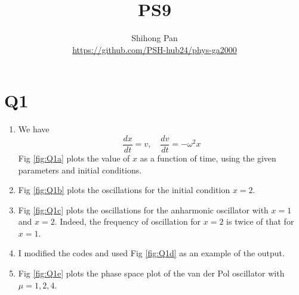 \documentclass[11pt]{article}
\title{PS9}
\author{Shihong Pan\\ \url{https://github.com/PSH-hub24/phys-ga2000}}
\begin{document}
\maketitle

\section*{Q1}
\begin{enumerate}[label=\alph*)]
    \item We have
    \begin{equation}
        \frac{dx}{dt}=v,\quad \frac{dv}{dt}=-\omega^2x
        \label{eq:1stOrder}
    \end{equation}
    Fig \ref{fig:Q1a} plots the value of $x$ as a function of time, using the given parameters and initial conditions.
    \item Fig \ref{fig:Q1b} plots the oscillations for the initial condition $x=2$.
    \item Fig \ref{fig:Q1c} plots the oscillations for the anharmonic oscillator with $x=1$ and $x=2$. Indeed, the frequency of oscillation for $x=2$ is twice of that for $x=1$.
    \item I modified the codes and used Fig \ref{fig:Q1d} as an example of the output.
    \item Fig \ref{fig:Q1e} plots the phase space plot of the van der Pol oscillator with $\mu=1,2,4$.
\end{enumerate}
\end{document}
